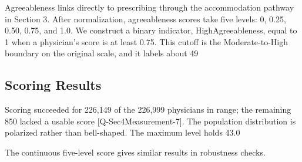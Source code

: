 Agreeableness links directly to prescribing through the accommodation pathway in Section 3. After normalization, agreeableness scores take five levels: 0, 0.25, 0.50, 0.75, and 1.0. We construct a binary indicator, HighAgreeableness, equal to 1 when a physician's score is at least 0.75. This cutoff is the Moderate-to-High boundary on the original scale, and it labels about 49%

\subsection{Scoring Results}
Scoring succeeded for 226,149 of the 226,999 physicians in range; the remaining 850 lacked a usable score [Q-Sec4Measurement-7]. The population distribution is polarized rather than bell-shaped. The maximum level holds 43.0%

The continuous five-level score gives similar results in robustness checks.

